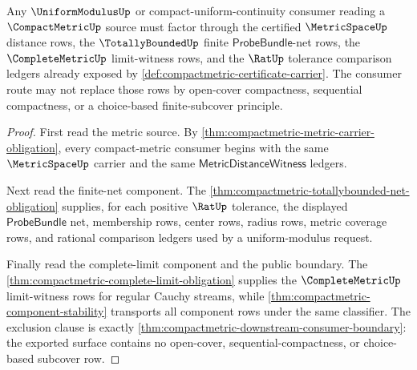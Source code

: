 \begin{theorem}
\label{thm:compactmetric-uniform-modulus-consumer-route}
Any $\UniformModulusUp$ or compact-uniform-continuity consumer reading a
$\CompactMetricUp$ source must factor through the certified
$\MetricSpaceUp$ distance rows, the $\TotallyBoundedUp$ finite
$\mathsf{ProbeBundle}$-net rows, the $\CompleteMetricUp$ limit-witness rows,
and the $\RatUp$ tolerance comparison ledgers already exposed by
\autoref{def:compactmetric-certificate-carrier}. The consumer route may not
replace those rows by open-cover compactness, sequential compactness, or a
choice-based finite-subcover principle.
\end{theorem}
\begin{proof}
First read the metric source. By
\autoref{thm:compactmetric-metric-carrier-obligation}, every compact-metric
consumer begins with the same $\MetricSpaceUp$ carrier and the same
$\mathsf{MetricDistanceWitness}$ ledgers.

Next read the finite-net component. The
\autoref{thm:compactmetric-totallybounded-net-obligation} supplies, for each
positive $\RatUp$ tolerance, the displayed $\mathsf{ProbeBundle}$ net,
membership rows, center rows, radius rows, metric coverage rows, and rational
comparison ledgers used by a uniform-modulus request.

Finally read the complete-limit component and the public boundary. The
\autoref{thm:compactmetric-complete-limit-obligation} supplies the
$\CompleteMetricUp$ limit-witness rows for regular Cauchy streams, while
\autoref{thm:compactmetric-component-stability} transports all component
rows under the same classifier. The exclusion clause is exactly
\autoref{thm:compactmetric-downstream-consumer-boundary}: the exported
surface contains no open-cover, sequential-compactness, or choice-based
subcover row.
\end{proof}



